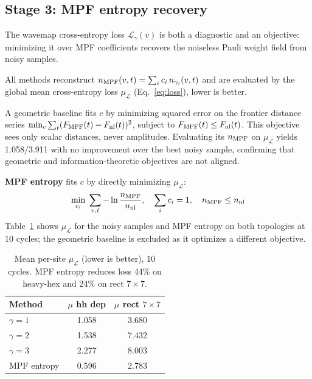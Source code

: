 \documentclass[letterpaper]{article}
\begin{document}
\subsection{Stage 3: MPF entropy recovery}

The wavemap cross-entropy loss $\mathcal{L}_\gamma(v)$ is both a
diagnostic and an objective: minimizing it over MPF coefficients
recovers the noiseless Pauli weight field from noisy samples.

All methods reconstruct $n_{\rm MPF}(v,t) = \sum_i c_i\, n_{\gamma_i}(v,t)$
and are evaluated by the global mean cross-entropy loss $\mu_\mathcal{L}$
(Eq.~\ref{eq:loss}), lower is better.

A geometric baseline fits $c$ by minimizing squared error on the
frontier distance series $\min_c \sum_t (F_{\rm MPF}(t)-F_{\rm nl}(t))^2$,
subject to $F_{\rm MPF}(t)\leq F_{\rm nl}(t)$.
This objective sees only scalar distances, never amplitudes.
Evaluating its $n_{\rm MPF}$ on $\mu_\mathcal{L}$ yields 1.058/3.911
with no improvement over the best noisy sample, confirming that
geometric and information-theoretic objectives are not aligned.

\textbf{MPF entropy} fits $c$ by directly minimizing $\mu_\mathcal{L}$:
\begin{equation}
    \min_{c_i}\; \sum_{v,t} -\ln\frac{n_{\rm MPF}}{n_{\rm nl}},\quad
    \sum_i c_i = 1,\quad n_{\rm MPF} \leq n_{\rm nl}
    \label{eq:entropy_mpf}
\end{equation}
Table~\ref{tab:entropy} shows $\mu_\mathcal{L}$ for the noisy samples
and MPF entropy on both topologies at 10 cycles; the geometric baseline
is excluded as it optimizes a different objective.

\begin{table}[t]
\centering
\small
\begin{tabular}{lcc}
\toprule
Method & $\mu$ hh dep & $\mu$ rect $7{\times}7$ \\
\midrule
$\gamma=1$       & 1.058 & 3.680 \\
$\gamma=2$       & 1.538 & 7.432 \\
$\gamma=3$       & 2.277 & 8.003 \\
\midrule
MPF entropy      & 0.596 & 2.783 \\
\bottomrule
\end{tabular}
\caption{Mean per-site $\mu_\mathcal{L}$ (lower is better), 10 cycles.
MPF entropy reduces loss 44\% on heavy-hex and 24\% on rect $7\times7$.}
\label{tab:entropy}
\end{table}
\end{document}
